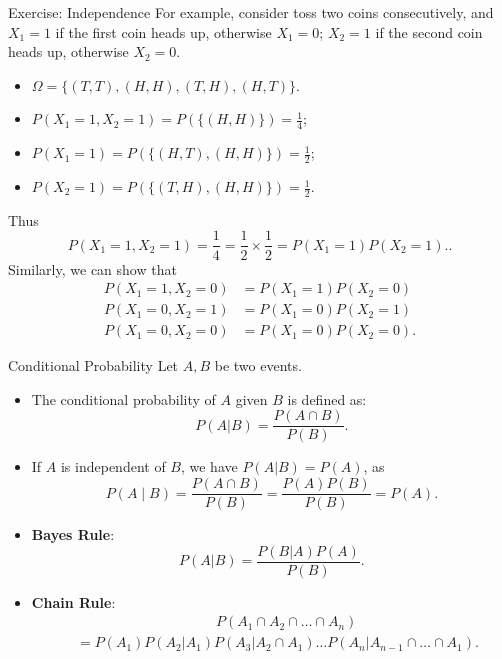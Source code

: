 \documentclass[10pt]{beamer}
\begin{document}
\begin{frame}{Exercise: Independence}
    For example, consider toss two coins consecutively, and $X_1 = 1$ if the first coin heads up, otherwise $X_1 = 0$; $X_2 = 1$ if the second coin heads up, otherwise $X_2 = 0$. 
        \begin{itemize}
            \item $\Omega = \{(T, T), (H, H), (T, H), (H, T)\}$.
            \item $P(X_1 = 1, X_2 = 1) = P(\{(H, H)\}) = \frac{1}{4}$;
            \item $P(X_1 = 1) = P(\{(H, T), (H, H)\}) = \frac{1}{2}$;
            \item $P(X_2 = 1) = P(\{(T, H), (H, H)\}) = \frac{1}{2}$.
        \end{itemize}
        Thus 
        \[
            P(X_1 = 1, X_2 = 1) = \frac{1}{4} = \frac{1}{2} \times \frac{1}{2} = P(X_1 = 1)P(X_2 = 1)..
        \]
        Similarly, we can show that
        \begin{align*}
            P(X_1 = 1, X_2 = 0) &= P(X_1 = 1)P( X_2 = 0) \\
            P(X_1 = 0, X_2 = 1) &= P(X_1 = 0)P( X_2 = 1) \\
            P(X_1 = 0, X_2 = 0) &= P(X_1 = 0)P( X_2 = 0).
        \end{align*}
\end{frame}

\begin{frame}{Conditional Probability}
Let $A, B$ be two events. 
\begin{itemize}
    \item The conditional probability of $A$ given $B$ is defined as:
    \[
    {P}(A|B) = \frac{{P}(A\cap B)}{{P}(B)}.
    \]
 \item If $A$ is independent of $B$, we have ${P}(A|B) = {P}(A)$, as 
 \[
    P(A \mid B) = \frac{P(A \cap B)}{P(B)} = \frac{P(A)P(B)}{P(B)} = P(A).
 \]
 \item \textbf{Bayes Rule}: 
 \[
 P(A|B) = \frac{P(B|A)P(A)}{P(B)}.
 \]
 \item \textbf{Chain Rule}: 
 \begin{align*}
     &\qquad\qquad\qquad\qquad\qquad P(A_1\cap A_2 \cap \dots \cap A_n) \\
     &= P(A_1) P(A_2|A_1)P(A_3|A_2\cap A_1)\dots P(A_n|A_{n-1}\cap \dots\cap A_1).
 \end{align*}
\end{itemize}
\end{frame}
\end{document}
